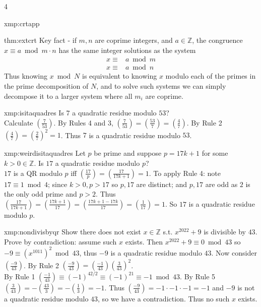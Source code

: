 \documentclass[landscape, 8pt]{extarticle}
\begin{document}
\begin{multicols*}{4}
\begin{xmp}{xmp:crtapp}{ }
		\end{xmp}
		
		
		\begin{thm}{thm:extcrt}{ }
			Key fact - if $m, n$ are coprime integers, and $a\in \mathbb{Z}$, the congruence $x \equiv a \bmod{m \cdot n}$ has the same integer solutions as the system
			\begin{align*}
				x \equiv& a \bmod{m}\\
				x \equiv& a \bmod{n}
			\end{align*}
			Thus knowing $x \bmod{N}$ is equivalent to knowing $x$ modulo each of the primes in the prime decomposition of $N$, and to solve such systems we can simply decompose it to a larger system where all $m_i$ are coprime.
			
		\end{thm}
		
		
		\begin{xmp}{xmp:isitaquadres}{ }
			Is $7$ a quadratic residue modulo $53$?\\
			Calculate $(\frac{7}{53})$. By Rules 4 and 3, $(\frac{7}{53}) = (\frac{53}{7}) = (\frac{4}{7})$. By Rule 2 $(\frac{4}{7}) = (\frac{2}{7})^2 = 1$. Thus $7$ is a quadratic residue modulo $53$.
			
		\end{xmp}
		
		
		\begin{xmp}{xmp:weirdisitaquadres}{ }
			Let $p$ be prime and suppose $p = 17k + 1$ for some $k > 0\in \mathbb{Z}$. Is $17$ a quadratic residue modulo $p$?\\
			$17$ is a QR modulo $p$ iff $(\frac{17}{p}) = (\frac{17}{17k + 1}) = 1$. To apply Rule 4: note $17 \equiv 1 \bmod{4}$; since $k > 0, p > 17$ so $p, 17$ are distinct; and $p, 17$ are odd as $2$ is the only odd prime and $p > 2$. Thus $(\frac{17}{17k + 1}) = (\frac{17k + 1}{17}) = (\frac{17k + 1 - 17k}{17}) = (\frac{1}{17}) = 1$. So $17$ is a quadratic residue modulo $p$.
		
		\end{xmp}
		
		
		\begin{xmp-s}{xmp:nondivisbyqr}{ }
			Show there does not exist $x\in \mathbb{Z}$ s.t. $x^{2022} + 9$ is divisible by $43$.\\
			Prove by contradiction: assume such $x$ exists. Then $x^{2022} + 9 \equiv 0 \bmod{43}$ so $-9 \equiv (x^{1011})^2 \bmod{43}$, thus $-9$ is a quadratic residue modulo $43$. Now consider $(\frac{-9}{43})$. By Rule 2 $(\frac{-9}{43}) = (\frac{-1}{43})(\frac{3}{43})^2$.\\
			By Rule 1 $(\frac{-1}{43}) \equiv (-1)^{42/2} \equiv (-1)^21 \equiv -1 \bmod{43}$. By Rule 5 $(\frac{3}{43}) = - (\frac{43}{3}) = -(\frac{1}{3}) = -1$. Thus $(\frac{-9}{43}) = -1 \cdot -1 \cdot -1 = -1$ and $-9$ is not a quadratic residue modulo $43$, so we have a contradiction. Thus no such $x$ exists.
		

\end{xmp-s}
\end{multicols*}
\end{document}
